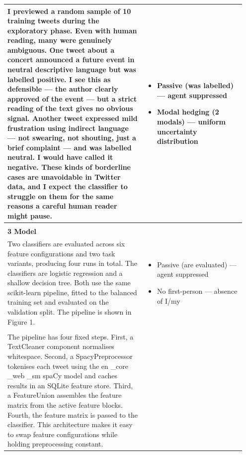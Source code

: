 \documentclass[11pt]{article}
\begin{document}
\begin{longtable}{|p{0.55\linewidth}|p{0.40\linewidth}|}
I previewed a random sample of 10 training tweets during the exploratory phase. Even with human reading, many were genuinely ambiguous. One tweet about a concert announced a future event in neutral descriptive language but was labelled positive. I see this as defensible --- the author clearly approved of the event --- but a strict reading of the text gives no obvious signal. Another tweet expressed mild frustration using indirect language --- not swearing, not shouting, just a brief complaint --- and was labelled neutral. I would have called it negative. These kinds of borderline cases are unavoidable in Twitter data, and I expect the classifier to struggle on them for the same reasons a careful human reader might pause. & \begin{itemize}[leftmargin=1em,itemsep=1pt,topsep=1pt,parsep=0pt]
  \item Passive (was labelled) --- agent suppressed
  \item Modal hedging (2 modals) --- uniform uncertainty distribution
\end{itemize} \\[2pt]
\hline
\rule[-3.5cm]{0pt}{3.5cm} & \\
\hline
\textbf{3 Model}\\[4pt]
Two classifiers are evaluated across six feature configurations and two task variants, producing four runs in total. The classifiers are logistic regression and a shallow decision tree. Both use the same scikit-learn pipeline, fitted to the balanced training set and evaluated on the validation split. The pipeline is shown in Figure 1. & \begin{itemize}[leftmargin=1em,itemsep=1pt,topsep=1pt,parsep=0pt]
  \item Passive (are evaluated) --- agent suppressed
  \item No first-person --- absence of I/my
\end{itemize} \\[2pt]
\hline
\rule[-3.5cm]{0pt}{3.5cm} & \\
\hline
The pipeline has four fixed steps. First, a TextCleaner component normalises whitespace. Second, a SpacyPreprocessor tokenises each tweet using the en \_core \_web \_sm spaCy model and caches results in an SQLite feature store. Third, a FeatureUnion assembles the feature matrix from the active feature blocks. Fourth, the feature matrix is passed to the classifier. This architecture makes it easy to swap feature configurations while holding preprocessing constant. & \begin{itemize}[leftmargin=1em,itemsep=1pt,topsep=1pt,parsep=0pt]

\end{itemize}
\end{longtable}
\end{document}
